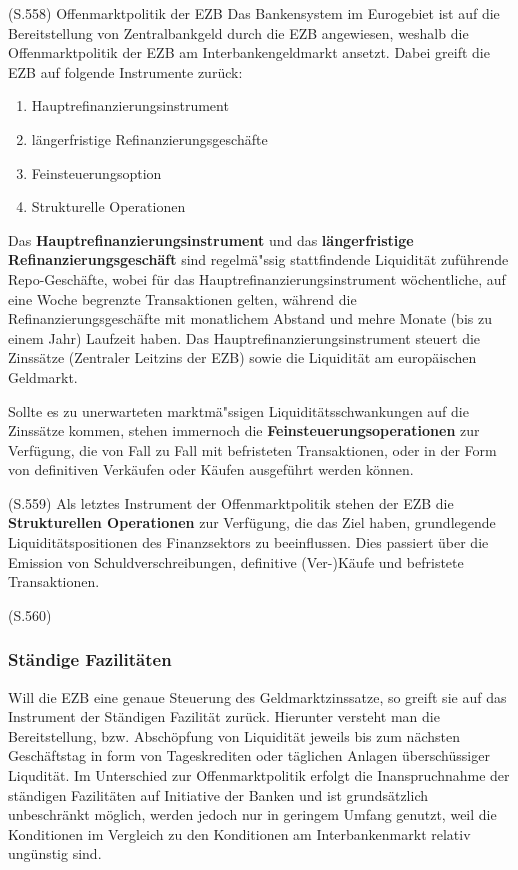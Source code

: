 \documentclass[
      onecolumn,
      a4paper,
      abstracton,
      parskip=half
      ,final
      ]{scrartcl}
\begin{document}
(S.558)
Offenmarktpolitik der EZB
Das Bankensystem im Eurogebiet ist auf die Bereitstellung von Zentralbankgeld durch die EZB angewiesen, weshalb die Offenmarktpolitik der EZB am Interbankengeldmarkt ansetzt. Dabei greift die EZB auf folgende Instrumente zur{\"u}ck:
\begin{enumerate}
  \item{Hauptrefinanzierungsinstrument}
  \item{l{\"a}ngerfristige Refinanzierungsgesch{\"a}fte}
  \item{Feinsteuerungsoption}
  \item{Strukturelle Operationen}
  \end{enumerate}

Das \textbf{Hauptrefinanzierungsinstrument} und das \textbf{l{\"a}ngerfristige Refinanzierungsgesch{\"a}ft} sind regelm{\"a}{"ss}ig stattfindende Liquidit{\"a}t zuf{\"u}hrende Repo-Gesch{\"a}fte, wobei f{\"u}r das Hauptrefinanzierungsinstrument w{\"o}chentliche, auf eine Woche begrenzte Transaktionen gelten, w{\"a}hrend die Refinanzierungsgesch{\"a}fte mit monatlichem Abstand und mehre Monate (bis zu einem Jahr) Laufzeit haben. Das Hauptrefinanzierungsinstrument steuert die Zinss{\"a}tze (Zentraler Leitzins der EZB) sowie die Liquidit{\"a}t am europ{\"a}ischen Geldmarkt.

Sollte es zu unerwarteten marktm{\"a}{"ss}igen Liquidit{\"a}tsschwankungen auf die Zinss{\"a}tze kommen, stehen immernoch die \textbf{Feinsteuerungsoperationen} zur Verf{\"u}gung, die von Fall zu Fall mit befristeten Transaktionen, oder in der Form von definitiven Verk{\"a}ufen oder K{\"a}ufen ausgef{\"u}hrt werden k{\"o}nnen.

(S.559)
Als letztes Instrument der Offenmarktpolitik stehen der EZB die \textbf{Strukturellen Operationen} zur Verf{\"u}gung, die das Ziel haben, grundlegende Liquidit{\"a}tspositionen des Finanzsektors zu beeinflussen. Dies passiert {\"u}ber die Emission von Schuldverschreibungen, definitive (Ver-)K{\"a}ufe und befristete Transaktionen.

(S.560)

\subsubsection{St{\"a}ndige Fazilit{\"a}ten}

Will die EZB eine genaue Steuerung des Geldmarktzinssatze, so greift sie auf das Instrument der St{\"a}ndigen Fazilit{\"a}t zur{\"u}ck. Hierunter versteht man die Bereitstellung, bzw. Absch{\"o}pfung von Liquidit{\"a}t jeweils bis zum n{\"a}chsten Gesch{\"a}ftstag in form von Tageskrediten oder t{\"a}glichen Anlagen {\"u}bersch{\"u}ssiger Liqudit{\"a}t. Im Unterschied zur Offenmarktpolitik erfolgt die Inanspruchnahme der st{\"a}ndigen Fazilit{\"a}ten auf Initiative der Banken und ist grunds{\"a}tzlich unbeschr{\"a}nkt m{\"o}glich, werden jedoch nur in geringem Umfang genutzt, weil die Konditionen im Vergleich zu den Konditionen am Interbankenmarkt relativ ung{\"u}nstig sind.
\end{document}
